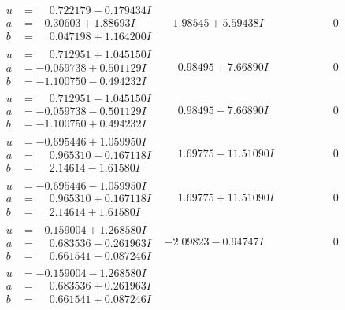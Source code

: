 \documentclass[1p]{elsarticle_modified}
\theoremstyle{definition}
\begin{document}
$$\begin{array}{c|c|c}
\begin{aligned}
u &= \phantom{-}0.722179 - 0.179434 I \\
a &= -0.30603 + 1.88693 I \\
b &= \phantom{-}0.047198 + 1.164200 I\end{aligned}
 & -1.98545 + 5.59438 I & \phantom{-0.000000 } 0 \\ \hline\begin{aligned}
u &= \phantom{-}0.712951 + 1.045150 I \\
a &= -0.059738 + 0.501129 I \\
b &= -1.100750 - 0.494232 I\end{aligned}
 & \phantom{-}0.98495 + 7.66890 I & \phantom{-0.000000 } 0 \\ \hline\begin{aligned}
u &= \phantom{-}0.712951 - 1.045150 I \\
a &= -0.059738 - 0.501129 I \\
b &= -1.100750 + 0.494232 I\end{aligned}
 & \phantom{-}0.98495 - 7.66890 I & \phantom{-0.000000 } 0 \\ \hline\begin{aligned}
u &= -0.695446 + 1.059950 I \\
a &= \phantom{-}0.965310 - 0.167118 I \\
b &= \phantom{-}2.14614 - 1.61580 I\end{aligned}
 & \phantom{-}1.69775 - 11.51090 I & \phantom{-0.000000 } 0 \\ \hline\begin{aligned}
u &= -0.695446 - 1.059950 I \\
a &= \phantom{-}0.965310 + 0.167118 I \\
b &= \phantom{-}2.14614 + 1.61580 I\end{aligned}
 & \phantom{-}1.69775 + 11.51090 I & \phantom{-0.000000 } 0 \\ \hline\begin{aligned}
u &= -0.159004 + 1.268580 I \\
a &= \phantom{-}0.683536 - 0.261963 I \\
b &= \phantom{-}0.661541 - 0.087246 I\end{aligned}
 & -2.09823 - 0.94747 I & \phantom{-0.000000 } 0 \\ \hline\begin{aligned}
u &= -0.159004 - 1.268580 I \\
a &= \phantom{-}0.683536 + 0.261963 I \\
b &= \phantom{-}0.661541 + 0.087246 I\end{aligned}

\end{array}$$
\end{document}

